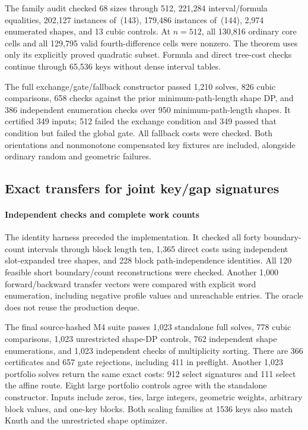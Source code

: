 \documentclass[11pt]{article}
\begin{document}
The family audit checked 68 sizes through 512, 221,284 interval/formula
equalities, 202,127 instances of~(143), 179,486
instances of~(144), 2,974 enumerated shapes, and 13
cubic controls. At $n=512$, all 130,816 ordinary core cells and all
129,795 valid fourth-difference cells were nonzero. The theorem uses only
its explicitly proved quadratic subset. Formula and direct tree-cost
checks continue through 65,536 keys without dense interval tables.

The full exchange/gate/fallback constructor passed 1,210 solves, 826 cubic
comparisons, 658 checks against the prior minimum-path-length shape DP,
and 386 independent enumeration checks over 950 minimum-path-length
shapes. It certified 349 inputs; 512 failed the exchange condition and
349 passed that condition but failed the global gate. All fallback costs
were checked. Both orientations and nonmonotone compensated key fixtures
are included, alongside ordinary random and geometric failures.




\subsection{Exact transfers for joint key/gap signatures}
\paragraph{Independent checks and complete work counts}\label{sec:legacy-23-5}
The identity harness preceded the implementation. It checked all forty
boundary-count intervals through block length ten, 1,365 direct costs
using independent slot-expanded tree shapes, and 228 block path-independence
identities. All 120 feasible short boundary/count reconstructions were
checked. Another 1,000 forward/backward transfer vectors were compared
with explicit word enumeration, including negative profile values and
unreachable entries. The oracle does not reuse the production deque.

The final source-hashed M4 suite passes 1,023 standalone full solves,
778 cubic comparisons, 1,023 unrestricted shape-DP controls, 762
independent shape enumerations, and 1,023 independent checks of multiplicity
sorting. There are 366 certificates and 657 gate rejections, including
411 in preflight. Another 1,023 portfolio solves return the same exact
costs: 912 select signatures and 111 select the affine route. Eight large
portfolio controls agree with the standalone constructor. Inputs include
zeros, ties, large integers, geometric weights, arbitrary block values,
and one-key blocks. Both scaling families at 1536 keys also match Knuth
and the unrestricted shape optimizer.
\end{document}
